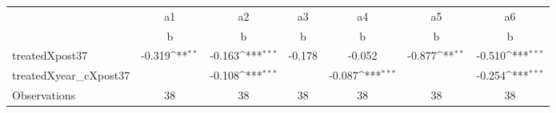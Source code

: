 {
\def\sym#1{\ifmmode^{#1}\else\(^{#1}\)\fi}
\begin{tabular}{l*{6}{c}}
\toprule
                    &          a1         &          a2         &          a3         &          a4         &          a5         &          a6         \\
                    &           b         &           b         &           b         &           b         &           b         &           b         \\
\midrule
treatedXpost37      &      -0.319\sym{**} &      -0.163\sym{***}&      -0.178         &      -0.052         &      -0.877\sym{**} &      -0.510\sym{***}\\
treatedXyear\_cXpost37&                     &      -0.108\sym{***}&                     &      -0.087\sym{***}&                     &      -0.254\sym{***}\\
\midrule
Observations        &          38         &          38         &          38         &          38         &          38         &          38         \\
\bottomrule
\end{tabular}
}
